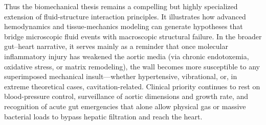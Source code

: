 Thus the biomechanical thesis remains a compelling but highly specialized extension of fluid-structure interaction principles. It illustrates how advanced hemodynamics and tissue-mechanics modeling can generate hypotheses that bridge microscopic fluid events with macroscopic structural failure. In the broader gut–heart narrative, it serves mainly as a reminder that once molecular inflammatory injury has weakened the aortic media (via chronic endotoxemia, oxidative stress, or matrix remodeling), the wall becomes more susceptible to any superimposed mechanical insult—whether hypertensive, vibrational, or, in extreme theoretical cases, cavitation-related. Clinical priority continues to rest on blood-pressure control, surveillance of aortic dimensions and growth rate, and recognition of acute gut emergencies that alone allow physical gas or massive bacterial loads to bypass hepatic filtration and reach the heart.
